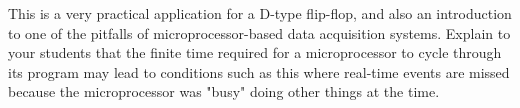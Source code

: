 





This is a very practical application for a D-type flip-flop, and also an introduction to one of the pitfalls of microprocessor-based data acquisition systems.  Explain to your students that the finite time required for a microprocessor to cycle through its program may lead to conditions such as this where real-time events are missed because the microprocessor was "busy" doing other things at the time.




